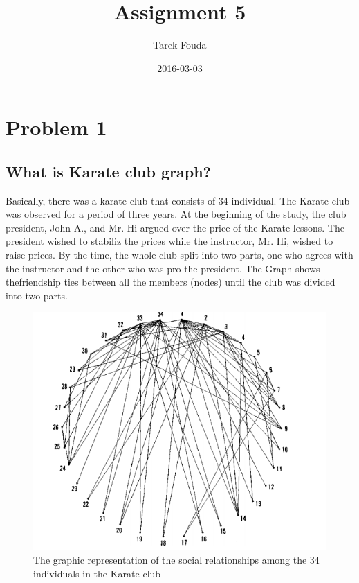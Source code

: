 \documentclass{article}
\title{Assignment 5}
\date{2016-03-03}
\author{Tarek Fouda}
\begin{document}
  \maketitle


\section{Problem 1} \label{problem1}

\subsection{What is Karate club graph?}

Basically, there was a karate club that consists of 34 individual. The Karate club was observed for a period of three years. At the beginning of the study, the club president, John A., and Mr. Hi argued over the price of the Karate lessons. The president wished to stabiliz the prices while the instructor, Mr. Hi, wished to raise prices. By the time, the whole club split into two parts, one who agrees with the instructor and the other who was pro the president. The Graph shows thefriendship ties between all the members (nodes) until the club was divided into two parts.
\begin{figure}
\centering
\includegraphics[scale=0.95]{1.png}
\caption{The graphic representation of the social relationships among the 34 individuals in the Karate club}
\label{fig:1.png}
\end{figure}
\newpage
\end{document}
